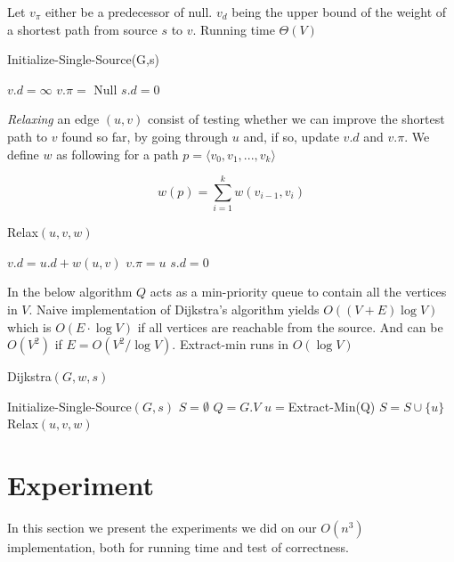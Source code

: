 Let $v_\pi$ either be a predecessor of null. $v_d$ being the upper bound of
the weight of a shortest path from source $s$ to $v$. Running time $\Theta (V)$

\begin{algorithm} 
	\caption{Initialize-Single-Source(G,s)}
	\begin{algorithmic}[1] 
			\State $v.d = \infty$
			\State $v.\pi =$ Null
		\EndFor 
		\State $s.d = 0$ 
	\end{algorithmic} \end{algorithm}

	\emph{Relaxing} an edge $(u,v)$ consist of testing whether we can improve the shortest
path to $v$ found so far, by going through $u$ and, if so, update $v.d$ and
$v.\pi$. We define $w$ as following for a path $p=\langle v_0,v_1,...,v_k
\rangle$

$$ w(p) = \sum_{i=1}^k w(v_{i-1},v_i) $$

\begin{algorithm} 
	\caption{Relax$(u,v,w)$} 
	\begin{algorithmic}[1] 
			\State $v.d=u.d+w(u,v)$ 
			\State $v.\pi = u$ 
		\EndIf 
		\State $s.d = 0$
	\end{algorithmic} 
\end{algorithm}

In the below algorithm $Q$ acts as a min-priority queue to contain all the
	vertices in $V$. Naive implementation of Dijkstra's algorithm yields
	$O((V+E)\log V)$ which is $O(E \cdot \log V)$ if all vertices are reachable
	from the source. And can be $O(V^2)$ if $E=O(V^2/\log V)$. Extract-min runs
	in $O(\log V)$ 

\begin{algorithm}[H]
	\caption{Dijkstra$(G,w,s)$} 
	\begin{algorithmic}[1] 
		\State Initialize-Single-Source$(G,s)$
		\State $S = \emptyset$ 
		\State $Q = G.V$ 
			\State $u = $Extract-Min(Q) 
			\State $S = S \cup \{u\}$
				\State Relax$(u,v,w)$
			\EndFor 
		\EndWhile
	\end{algorithmic} 
\end{algorithm}

\section{Experiment}
In this section we present the experiments we did on our $O(n^3)$ implementation,
both for running time and test of correctness.

